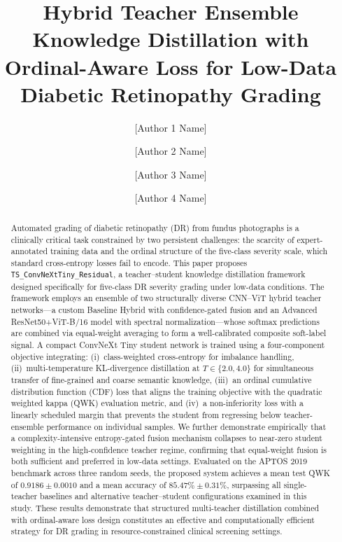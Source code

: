 \documentclass[a4paper,fleqn]{cas-dc}
\begin{document}
\sloppy
\let\WriteBookmarks\relax
\def\floatpagepagefraction{1}
\def\textpagefraction{.001}

\title[mode=title]{Hybrid Teacher Ensemble Knowledge Distillation with Ordinal-Aware Loss for Low-Data Diabetic Retinopathy Grading}

\author[1]{[Author 1 Name]}
\author[1]{[Author 2 Name]}
\author[2]{[Author 3 Name]}
\author[2]{[Author 4 Name]}
\cormark[1]
\address[1]{[Department], [University], [City], [Country]}
\address[2]{[Department], [University], [City], [Country]}

\begin{abstract}
Automated grading of diabetic retinopathy (DR) from fundus photographs is a clinically critical task constrained by two persistent challenges: the scarcity of expert-annotated training data and the ordinal structure of the five-class severity scale, which standard cross-entropy losses fail to encode. This paper proposes \texttt{TS\_ConvNeXtTiny\_Residual}, a teacher--student knowledge distillation framework designed specifically for five-class DR severity grading under low-data conditions. The framework employs an ensemble of two structurally diverse CNN--ViT hybrid teacher networks---a custom Baseline Hybrid with confidence-gated fusion and an Advanced ResNet50+ViT-B/16 model with spectral normalization---whose softmax predictions are combined via equal-weight averaging to form a well-calibrated composite soft-label signal. A compact ConvNeXt Tiny student network is trained using a four-component objective integrating: (i)~class-weighted cross-entropy for imbalance handling, (ii)~multi-temperature KL-divergence distillation at $T \in \{2.0, 4.0\}$ for simultaneous transfer of fine-grained and coarse semantic knowledge, (iii)~an ordinal cumulative distribution function (CDF) loss that aligns the training objective with the quadratic weighted kappa (QWK) evaluation metric, and (iv)~a non-inferiority loss with a linearly scheduled margin that prevents the student from regressing below teacher-ensemble performance on individual samples. We further demonstrate empirically that a complexity-intensive entropy-gated fusion mechanism collapses to near-zero student weighting in the high-confidence teacher regime, confirming that equal-weight fusion is both sufficient and preferred in low-data settings. Evaluated on the APTOS 2019 benchmark across three random seeds, the proposed system achieves a mean test QWK of $\mathbf{0.9186 \pm 0.0010}$ and a mean accuracy of $\mathbf{85.47\% \pm 0.31\%}$, surpassing all single-teacher baselines and alternative teacher--student configurations examined in this study. These results demonstrate that structured multi-teacher distillation combined with ordinal-aware loss design constitutes an effective and computationally efficient strategy for DR grading in resource-constrained clinical screening settings.
\end{abstract}
\end{document}

